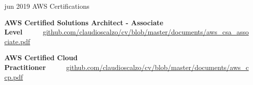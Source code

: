 



\begin{cventries}

	\cvproj
        {jun 2019}
        {AWS Certifications}
        {}
        {}
        {
            \begin{cvitems}
                \item \textbf{AWS Certified Solutions Architect - Associate Level}~~~\textbullet~~~\href{https://github.com/claudioscalzo/cv/blob/master/documents/aws\_csa\_associate\_scalzo.pdf}{github.com/claudioscalzo/cv/blob/master/documents/aws\_csa\_associate.pdf}
                \item \textbf{AWS Certified Cloud Practitioner}~~~\textbullet~~~\href{https://github.com/claudioscalzo/cv/blob/master/documents/aws\_ccp\_scalzo.pdf}{github.com/claudioscalzo/cv/blob/master/documents/aws\_ccp.pdf}
            \end{cvitems}
        }
\end{cventries}
